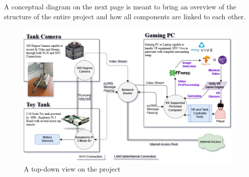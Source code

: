 \newpage
\begin{landscape}
    A conceptual diagram on the next page is meant to bring an overview of the structure of the entire project and how all components are linked to each other.
	\begin{figure}[H]%
        \centering
        \includegraphics[width=0.8\linewidth]{background/fig/ConceptDiagram.png}
        \caption{A top-down view on the project}
    \end{figure}
\end{landscape}
